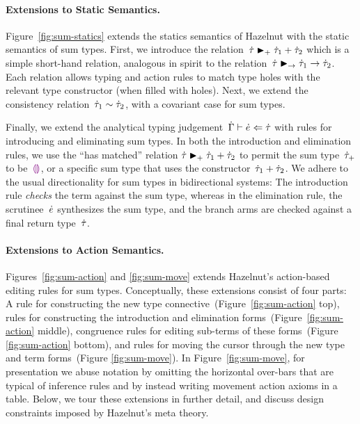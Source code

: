 \paragraph{Extensions to Static Semantics.}
Figure~\ref{fig:sum-statics} extends the statics semantics of Hazelnut
with the static semantics of sum types.
%
First, we introduce the
relation~$\dot{\tau} \mathrel{\textcolor{black}{\blacktriangleright_{+}}} {\dot{\tau}_1} + {\dot{\tau}_2}$ which is a
simple short-hand relation, analogous in spirit to the
relation~$\dot{\tau} \blacktriangleright_{\rightarrow} \dot{\tau}_1 \rightarrow \dot{\tau}_2$.  Each relation
allows typing and action rules to match type holes with the relevant
type constructor (when filled with holes).
%
Next, we extend the consistency relation~$\dot{\tau}_1 \sim \dot{\tau}_2$,
with a covariant case for sum types.

Finally, we extend the analytical typing
judgement~$\dot{\Gamma} \vdash \dot{e} \Leftarrow \dot{\tau}$ with rules for introducing
and eliminating sum types.
%
In both the introduction and elimination rules, we use the ``has
matched'' relation $\dot{\tau} \mathrel{\textcolor{black}{\blacktriangleright_{+}}} {\dot{\tau}_1} + {\dot{\tau}_2}$ to
permit the sum type~$\dot{\tau}_+$ to be~$\textcolor{violet}{\llparenthesis}\textcolor{violet}{\rrparenthesis}$, or a specific sum type
that uses the constructor~$\dot{\tau}_1 + \dot{\tau}_2$.
%
We adhere to the usual directionality for sum types in bidirectional
 systems: The introduction rule \emph{checks} the term against the sum
 type, whereas in the elimination rule, the scrutinee~$\dot{e}$
 synthesizes the sum type, and the branch arms are checked against a
 final return type~$\dot{\tau}$.
%


\paragraph{Extensions to Action Semantics.}
Figures~\ref{fig:sum-action} and \ref{fig:sum-move} extends Hazelnut's
action-based editing rules for sum types.
%
Conceptually, these extensions consist of four parts: A rule for
constructing the new type connective~(Figure~\ref{fig:sum-action}
top), rules for constructing the introduction and elimination
forms~(Figure~\ref{fig:sum-action} middle), congruence rules for
editing sub-terms of these forms~(Figure \ref{fig:sum-action} bottom),
and rules for moving the cursor through the new type and term
forms~(Figure \ref{fig:sum-move}).  In Figure~\ref{fig:sum-move}, for
presentation we abuse notation by omitting the horizontal over-bars
that are typical of inference rules and by instead writing movement
action axioms in a table.
%
Below, we tour these extensions in further detail, and discuss design
constraints imposed by Hazelnut's meta theory.

